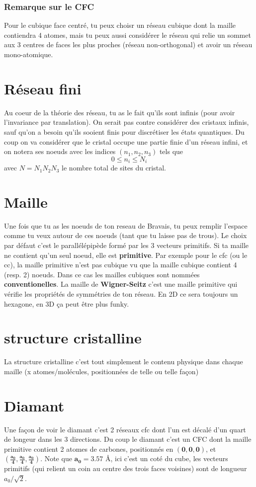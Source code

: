 \documentclass[a4paper]{report}
\begin{document}
  \subsubsection{Remarque sur le CFC}
  Pour le cubique face centré, tu peux choisr un réseau cubique dont la maille contiendra 4 atomes, mais tu peux aussi considérer le réseau qui relie un sommet aux 3 centres de faces les plus proches (réseau non-orthogonal) et avoir un réseau mono-atomique.
  \section{Réseau fini}
  Au coeur de la théorie des réseau, tu as le fait qu'ils sont infinis (pour avoir l'invariance par translation). On serait pas contre considérer des cristaux infinis, sauf qu'on a besoin qu'ils sooient finis pour discrétiser les états quantiques. Du coup on va considérer que le cristal occupe une partie finie d'un réseau infini, et on notera ses noeuds  avec les indices $(n_1,n_2,n_3)$ tels que $$0\leq n_i \leq N_i$$ avec $N=N_1N_2N_3$ le nombre total de sites du cristal.
  \section{Maille}
  Une fois que tu as les noeuds de ton reseau de Bravais, tu peux remplir l'espace comme tu veux autour de ces noeuds (tant que tu laisse pas de trous). Le choix par défaut c'est le parallélépipède formé par les 3 vecteurs primitifs. Si ta maille ne contient qu'un seul noeud, elle est \textbf{primitive}. Par exemple pour le cfc (ou le cc), la maille primitive n'est pas cubique vu que la maille cubique contient 4 (resp. 2) noeuds. Dans ce cas les mailles cubiques sont nommées \textbf{conventionelles}. La maille de \textbf{Wigner-Seitz} c'est une maille primitive qui vérifie les propriétés de symmétries de ton réseau. En 2D ce sera toujours un hexagone, en 3D ça peut être plus funky.
  \section{structure cristalline}
  La structure cristalline c'est tout simplement le contenu physique dans chaque maille (x atomes/molécules, positionnées de telle ou telle façon)
  \section{Diamant}
  Une façon de voir le diamant c'est 2 réseaux cfc dont l'un est décalé d'un quart de longeur dans les 3 directions. Du coup le diamant c'est un CFC dont la maille primitive contient 2 atomes de carbones, positionnés en $\mathbf{(0,0,0)}$, et $\mathbf{(\frac{a_0}{4},\frac{a_0}{4},\frac{a_0}{4})}$. Note que $\mathbf{a_0}=3.57$ \AA , ici c'est un coté du cube, les vecteurs primitifs (qui relient un coin au centre des trois faces voisines) sont de longueur $a_0/\sqrt{2}$.
\end{document}
